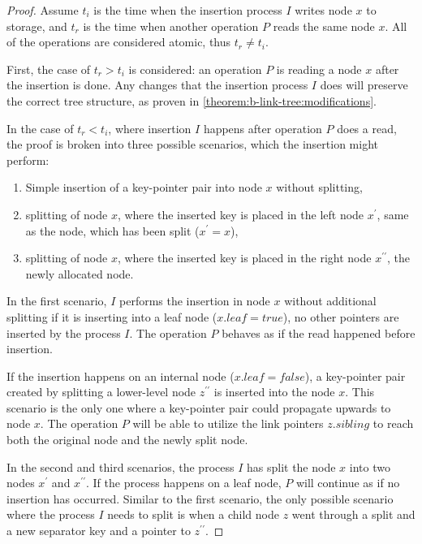 \begin{proof}
  Assume $t_i$ is the time when the insertion process $I$ writes node $x$ to storage, and $t_r$ is the time when another operation $P$ reads the same node $x$. All of the operations are considered atomic, thus $t_r \neq t_i$.

  First, the case of $t_r > t_i$ is considered: an operation $P$ is reading a node $x$ after the insertion is done. Any changes that the insertion process $I$ does will preserve the correct tree structure, as proven in \cref{theorem:b-link-tree:modifications}.

  In the case of $t_r < t_i$, where insertion $I$ happens after operation $P$ does a read, the proof is broken into three possible scenarios, which the insertion might perform:

  \begin{enumerate}
    \item Simple insertion of a key-pointer pair into node $x$ without splitting,
    \item splitting of node $x$, where the inserted key is placed in the left node $x^\prime$, same as the node, which has been split ($x^\prime = x$),
    \item splitting of node $x$, where the inserted key is placed in the right node $x^{\prime\prime}$, the newly allocated node.
  \end{enumerate}

  In the first scenario, $I$ performs the insertion in node $x$ without additional splitting if it is inserting into a leaf node ($x.\mathit{leaf} = \mathit{true}$), no other pointers are inserted by the process $I$. The operation $P$ behaves as if the read happened before insertion.

  If the insertion happens on an internal node ($x.\mathit{leaf} = \mathit{false}$), a key-pointer pair created by splitting a lower-level node $z^{\prime\prime}$ is inserted into the node $x$. This scenario is the only one where a key-pointer pair could propagate upwards to node $x$. The operation $P$ will be able to utilize the link pointers $z.\mathit{sibling}$ to reach both the original node and the newly split node.

  In the second and third scenarios, the process $I$ has split the node $x$ into two nodes $x^\prime$ and $x^{\prime\prime}$. If the process happens on a leaf node, $P$ will continue as if no insertion has occurred. Similar to the first scenario, the only possible scenario where the process $I$ needs to split is when a child node $z$ went through a split and a new separator key and a pointer to $z^{\prime\prime}$.


\end{proof}
